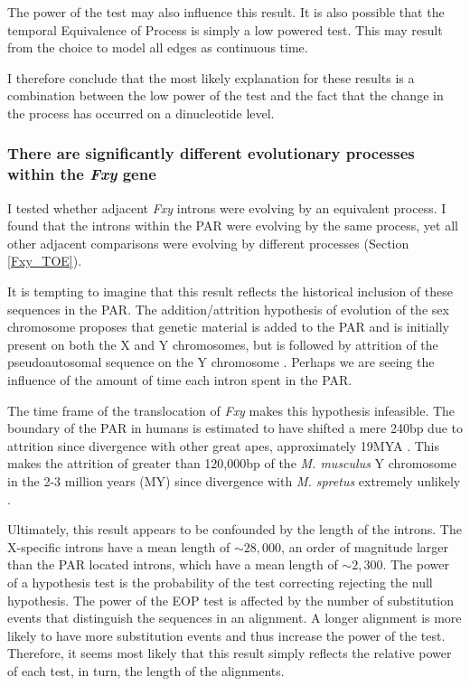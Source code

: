 The power of the test may also influence this result. It is also possible that the temporal Equivalence of Process is simply a low powered test. This may result from the choice to model all edges as continuous time. 

I therefore conclude that the most likely explanation for these results is a combination between the low power of the test and the fact that the change in the process has occurred on a dinucleotide level. 

\subsubsection{There are significantly different evolutionary processes within the \textit{Fxy} gene}

I tested whether adjacent \textit{Fxy} introns were evolving by an equivalent process. I found that the introns within the PAR were evolving by the same process, yet all other adjacent comparisons were evolving by different processes (Section \ref{Fxy_TOE}). 

It is tempting to imagine that this result reflects the historical inclusion of these sequences in the PAR. The addition/attrition hypothesis of evolution of the sex chromosome proposes that genetic material is added to the PAR and is initially present on both the X and Y chromosomes, but is followed by attrition of the pseudoautosomal sequence on the Y chromosome  \citep{Graves1995TheGenes}. Perhaps we are seeing the influence of the amount of time each intron spent in the PAR. 

The time frame of the translocation of \textit{Fxy} makes this hypothesis infeasible. The boundary of the PAR in humans is estimated to have shifted a mere 240bp due to attrition since divergence with other great apes, approximately 19MYA \citep{Mensah2014PseudoautosomalPopulation}. This makes the attrition of greater than 120,000bp of the \textit{M. musculus} Y chromosome in the 2-3 million years (MY) since divergence with \textit{M. spretus} extremely unlikely \citep{Huang2005HowMammals}. 

Ultimately, this result appears to be confounded by the length of the introns. The X-specific introns have a mean length of $\sim28,000$, an order of magnitude larger than the PAR located introns, which have a mean length of $\sim2,300$. The power of a hypothesis test is the probability of the test correcting rejecting the null hypothesis. The power of the EOP test is affected by the number of substitution events that distinguish the sequences in an alignment. A longer alignment is more likely to have more substitution events and thus increase the power of the test. Therefore, it seems most likely that this result simply reflects the relative power of each test, in turn, the length of the alignments. 

